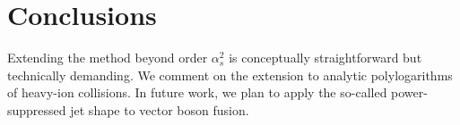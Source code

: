 \section{Conclusions}\label{sec:conclusions}

Extending the method beyond order $\alpha_s^2$ is conceptually
straightforward but technically demanding. We comment on the extension
to analytic polylogarithms of heavy-ion collisions. In future work, we
plan to apply the so-called power-suppressed jet shape to vector boson
fusion.

